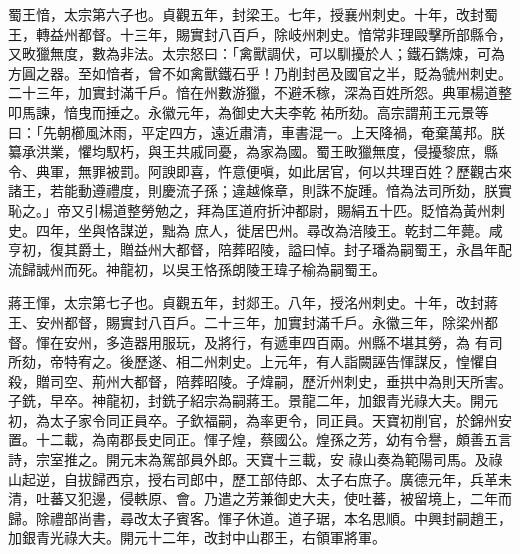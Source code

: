\begin{pinyinscope}
 蜀王愔，太宗第六子也。貞觀五年，封梁王。七年，授襄州刺史。十年，改封蜀王，轉益州都督。十三年，賜實封八百戶，除岐州刺史。愔常非理毆擊所部縣令，又畋獵無度，數為非法。太宗怒曰：「禽獸調伏，可以馴擾於人；鐵石鐫煉，可為方圓之器。至如愔者，曾不如禽獸鐵石乎！乃削封邑及國官之半，貶為虢州刺史。二十三年，加實封滿千戶。愔在州數游獵，不避禾稼，深為百姓所怨。典軍楊道整叩馬諫，愔曳而捶之。永徽元年，為御史大夫李乾
 祐所劾。高宗謂荊王元景等曰：「先朝櫛風沐雨，平定四方，遠近肅清，車書混一。上天降禍，奄棄萬邦。朕纂承洪業，懼均馭朽，與王共戚同憂，為家為國。蜀王畋獵無度，侵擾黎庶，縣令、典軍，無罪被罰。阿諛即喜，忤意便嗔，如此居官，何以共理百姓？歷觀古來諸王，若能動遵禮度，則慶流子孫；違越條章，則誅不旋踵。愔為法司所劾，朕實恥之。」帝又引楊道整勞勉之，拜為匡道府折沖都尉，賜絹五十匹。貶愔為黃州刺史。四年，坐與恪謀逆，黜為
 庶人，徙居巴州。尋改為涪陵王。乾封二年薨。咸亨初，復其爵土，贈益州大都督，陪葬昭陵，謚曰悼。封子璠為嗣蜀王，永昌年配流歸誠州而死。神龍初，以吳王恪孫朗陵王瑋子榆為嗣蜀王。



 蔣王惲，太宗第七子也。貞觀五年，封郯王。八年，授洺州刺史。十年，改封蔣王、安州都督，賜實封八百戶。二十三年，加實封滿千戶。永徽三年，除梁州都督。惲在安州，多造器用服玩，及將行，有遞車四百兩。州縣不堪其勞，為
 有司所劾，帝特宥之。後歷遂、相二州刺史。上元年，有人詣闕誣告惲謀反，惶懼自殺，贈司空、荊州大都督，陪葬昭陵。子煒嗣，歷沂州刺史，垂拱中為則天所害。子銑，早卒。神龍初，封銑子紹宗為嗣蔣王。景龍二年，加銀青光祿大夫。開元初，為太子家令同正員卒。子欽福嗣，為率更令，同正員。天寶初削官，於錦州安置。十二載，為南郡長史同正。惲子煌，蔡國公。煌孫之芳，幼有令譽，頗善五言詩，宗室推之。開元末為駕部員外郎。天寶十三載，安
 祿山奏為範陽司馬。及祿山起逆，自拔歸西京，授右司郎中，歷工部侍郎、太子右庶子。廣德元年，兵革未清，吐蕃又犯邊，侵軼原、會。乃遣之芳兼御史大夫，使吐蕃，被留境上，二年而歸。除禮部尚書，尋改太子賓客。惲子休道。道子琚，本名思順。中興封嗣趙王，加銀青光祿大夫。開元十二年，改封中山郡王，右領軍將軍。




\end{pinyinscope}
